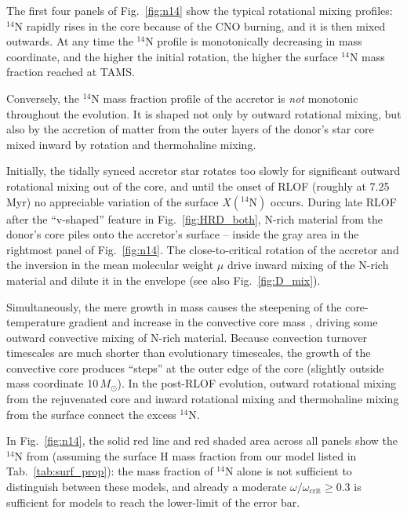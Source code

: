 \documentclass[twocolumn,twocolappendix,trackchanges]{aastex63}
\DeclareRobustCommand{\Figref}[1]{Fig.~\ref{#1}}
\DeclareRobustCommand{\Tabref}[1]{Tab.~\ref{#1}}
\begin{document}
The first four panels of \Figref{fig:n14} show the typical rotational
mixing profiles: $^{14}\mathrm{N}$ rapidly rises in the core because
of the CNO burning, and it is then mixed outwards. At any time
the $^{14}\mathrm{N}$ profile is monotonically decreasing in mass
coordinate, and the higher the initial rotation, the higher the
surface $^{14}\mathrm{N}$ mass fraction reached at TAMS.

Conversely, the $^{14}\mathrm{N}$ mass fraction profile of the
accretor is \emph{not} monotonic throughout the evolution. It is shaped not only by outward
rotational mixing, but also by the accretion of matter from the outer
layers of the donor's star core mixed inward by rotation and
thermohaline mixing.

Initially, the tidally synced accretor star
rotates too slowly for significant outward rotational mixing out of
the core, and until the onset of RLOF (roughly at 7.25\,Myr) no appreciable variation of the
surface $X(^{14}\mathrm{N})$ occurs. During late RLOF after the
``v-shaped'' feature in \Figref{fig:HRD_both}, N-rich material from the
donor's core piles onto the accretor's surface -- inside the gray area in
the rightmost panel of \Figref{fig:n14}. The close-to-critical
rotation of the accretor and the inversion in the mean molecular
weight $\mu$ drive inward mixing of
the N-rich material and dilute it in the envelope (see also \Figref{fig:D_mix}).

Simultaneously, the mere growth in mass causes the steepening of the
core-temperature gradient and increase in the convective core mass
\citep[rejuvenation, e.g.,][]{schneider:16}, driving some outward convective mixing
of N-rich material. Because convection turnover timescales are much
shorter than evolutionary timescales, the growth of the convective
core produces ``steps'' at the outer edge of the core (slightly
outside mass coordinate 10\,$M_\odot$). In the post-RLOF evolution,
outward rotational mixing from the rejuvenated core and inward
rotational mixing and thermohaline mixing from the surface connect the
excess $^{14}\mathrm{N}$.

In \Figref{fig:n14}, the solid red line and red shaded area across all panels show the
$^{14}\mathrm{N}$ from  (assuming the
surface H mass fraction from our model listed in \Tabref{tab:surf_prop}): the mass fraction of $^{14}\mathrm{N}$
alone is not sufficient to distinguish between these models, and already
a moderate $\omega/\omega_\mathrm{crit}\geq0.3$ is sufficient for
models to reach the lower-limit of the error bar.
\end{document}
